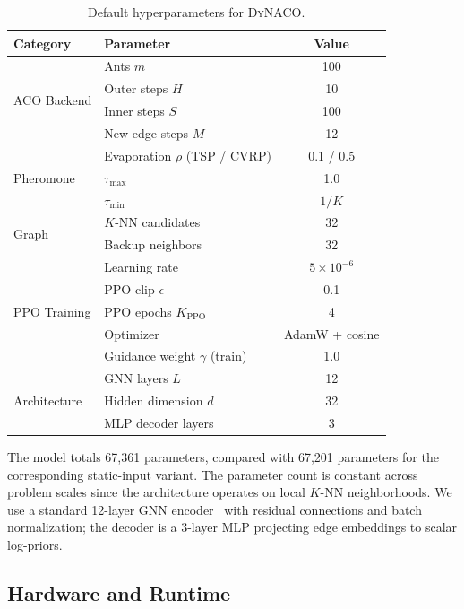 \documentclass[sigconf,nonacm]{acmart}
\newcommand{\DyNACO}{\textsc{DyNACO}}
\begin{document}
\begin{table}[h]
\centering
\caption{Default hyperparameters for \DyNACO{}.}
\label{tab:hyperparams}
\small
\begin{tabular}{llc}
\toprule
Category & Parameter & Value \\
\midrule
\multirow{4}{*}{ACO Backend}
    & Ants $m$ & 100 \\
    & Outer steps $H$ & 10 \\
    & Inner steps $S$ & 100 \\
    & New-edge steps $M$ & 12 \\
\midrule
\multirow{3}{*}{Pheromone}
    & Evaporation $\rho$ (TSP / CVRP) & 0.1 / 0.5 \\
    & $\tau_{\max}$ & 1.0 \\
    & $\tau_{\min}$ & $1/K$ \\
\midrule
\multirow{2}{*}{Graph}
    & $K$-NN candidates & 32 \\
    & Backup neighbors & 32 \\
\midrule
\multirow{5}{*}{PPO Training}
    & Learning rate & $5 \times 10^{-6}$ \\
    & PPO clip $\epsilon$ & 0.1 \\
    & PPO epochs $K_{\text{PPO}}$ & 4 \\
    & Optimizer & AdamW + cosine \\
    & Guidance weight $\gamma$ (train) & 1.0 \\
\midrule
\multirow{3}{*}{Architecture}
    & GNN layers $L$ & 12 \\
    & Hidden dimension $d$ & 32 \\
    & MLP decoder layers & 3 \\
\bottomrule
\end{tabular}
\end{table}

The model totals 67,361 parameters, compared with 67,201 parameters for the corresponding static-input variant. The parameter count is constant across problem scales since the architecture operates on local $K$-NN neighborhoods.
We use a standard 12-layer GNN encoder~\cite{deepaco} with residual connections and batch normalization; the decoder is a 3-layer MLP projecting edge embeddings to scalar log-priors.

\subsection{Hardware and Runtime}
\label{app:hardware}
\end{document}

